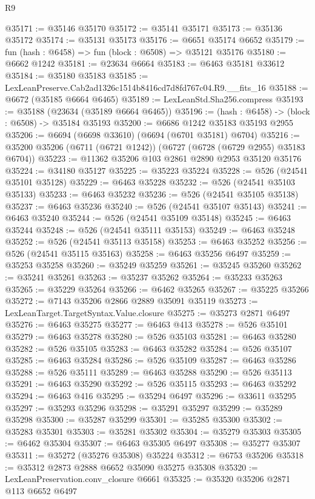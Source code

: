 \begin{lexlean}{R9}
\begin{coremodule}
@35171 := @35146 @35170
@35172 := @35141 @35171
@35173 := @35136 @35172
@35174 := @35131 @35173
@35176 := @6651 @35174 @6652
@35179 := fun (hash : @6458) => fun (block : @6508) => @35121 @35176
@35180 := @6662 @1242
@35181 := @23634 @6664
@35183 := @6463 @35181 @33612
@35184 := @35180 @35183
@35185 := LexLeanPreserve.Cab2ad1326c1514b8416cd7d8fd767c04.R9.__fits_16
@35188 := @6672 (@35185 @6664 @6465)
@35189 := LexLeanStd.Sha256.compress
@35193 := @35188 (@23634 (@35189 @6664 @6465))
@35196 := (hash : @6458) -> (block : @6508) -> @35184 @35193
@35200 := @6686 @1242 @35183 @35193 @2955
@35206 := @6694 (@6698 @33610) (@6694 (@6701 @35181) @6704)
@35216 := @35200 @35206 (@6711 (@6721 @1242)) (@6727 (@6728 (@6729 @2955) @35183 @6704))
@35223 := @11362 @35206 @103 @2861 @2890 @2953 @35120 @35176
@35224 := @34180 @35127
@35225 := @35223 @35224
@35228 := @526 (@24541 @35101 @35128)
@35229 := @6463 @35228
@35232 := @526 (@24541 @35103 @35133)
@35233 := @6463 @35232
@35236 := @526 (@24541 @35105 @35138)
@35237 := @6463 @35236
@35240 := @526 (@24541 @35107 @35143)
@35241 := @6463 @35240
@35244 := @526 (@24541 @35109 @35148)
@35245 := @6463 @35244
@35248 := @526 (@24541 @35111 @35153)
@35249 := @6463 @35248
@35252 := @526 (@24541 @35113 @35158)
@35253 := @6463 @35252
@35256 := @526 (@24541 @35115 @35163)
@35258 := @6463 @35256 @6497
@35259 := @35253 @35258
@35260 := @35249 @35259
@35261 := @35245 @35260
@35262 := @35241 @35261
@35263 := @35237 @35262
@35264 := @35233 @35263
@35265 := @35229 @35264
@35266 := @6462 @35265
@35267 := @35225 @35266
@35272 := @7143 @35206 @2866 @2889 @35091 @35119
@35273 := LexLeanTarget.TargetSyntax.Value.closure
@35275 := @35273 @2871 @6497
@35276 := @6463 @35275
@35277 := @6463 @413
@35278 := @526 @35101
@35279 := @6463 @35278
@35280 := @526 @35103
@35281 := @6463 @35280
@35282 := @526 @35105
@35283 := @6463 @35282
@35284 := @526 @35107
@35285 := @6463 @35284
@35286 := @526 @35109
@35287 := @6463 @35286
@35288 := @526 @35111
@35289 := @6463 @35288
@35290 := @526 @35113
@35291 := @6463 @35290
@35292 := @526 @35115
@35293 := @6463 @35292
@35294 := @6463 @416
@35295 := @35294 @6497
@35296 := @33611 @35295
@35297 := @35293 @35296
@35298 := @35291 @35297
@35299 := @35289 @35298
@35300 := @35287 @35299
@35301 := @35285 @35300
@35302 := @35283 @35301
@35303 := @35281 @35302
@35304 := @35279 @35303
@35305 := @6462 @35304
@35307 := @6463 @35305 @6497
@35308 := @35277 @35307
@35311 := @35272 (@35276 @35308) @35224
@35312 := @6753 @35206
@35318 := @35312 @2873 @2888 @6652 @35090 @35275 @35308
@35320 := LexLeanPreservation.conv_closure @6661
@35325 := @35320 @35206 @2871 @113 @6652 @6497

\end{coremodule}
\end{lexlean}
